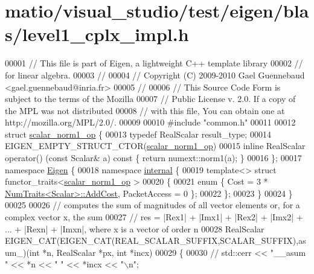 \hypertarget{matio_2visual__studio_2test_2eigen_2blas_2level1__cplx__impl_8h_source}{}\section{matio/visual\+\_\+studio/test/eigen/blas/level1\+\_\+cplx\+\_\+impl.h}
\label{matio_2visual__studio_2test_2eigen_2blas_2level1__cplx__impl_8h_source}

\begin{DoxyCode}
00001 \textcolor{comment}{// This file is part of Eigen, a lightweight C++ template library}
00002 \textcolor{comment}{// for linear algebra.}
00003 \textcolor{comment}{//}
00004 \textcolor{comment}{// Copyright (C) 2009-2010 Gael Guennebaud <gael.guennebaud@inria.fr>}
00005 \textcolor{comment}{//}
00006 \textcolor{comment}{// This Source Code Form is subject to the terms of the Mozilla}
00007 \textcolor{comment}{// Public License v. 2.0. If a copy of the MPL was not distributed}
00008 \textcolor{comment}{// with this file, You can obtain one at http://mozilla.org/MPL/2.0/.}
00009 
00010 \textcolor{preprocessor}{#include "common.h"}
00011 
00012 \textcolor{keyword}{struct }\hyperlink{structscalar__norm1__op}{scalar\_norm1\_op} \{
00013   \textcolor{keyword}{typedef} RealScalar result\_type;
00014   EIGEN\_EMPTY\_STRUCT\_CTOR(\hyperlink{structscalar__norm1__op}{scalar\_norm1\_op})
00015   \textcolor{keyword}{inline} RealScalar operator() (\textcolor{keyword}{const} Scalar& a)\textcolor{keyword}{ const }\{ \textcolor{keywordflow}{return} numext::norm1(a); \}
00016 \};
00017 \textcolor{keyword}{namespace }\hyperlink{namespace_eigen}{Eigen} \{
00018   \textcolor{keyword}{namespace }\hyperlink{namespaceinternal}{internal} \{
00019     \textcolor{keyword}{template}<> \textcolor{keyword}{struct }functor\_traits<\hyperlink{structscalar__norm1__op}{scalar\_norm1\_op} >
00020     \{
00021       \textcolor{keyword}{enum} \{ Cost = 3 * \hyperlink{group___core___module_struct_eigen_1_1_num_traits}{NumTraits<Scalar>::AddCost}, PacketAccess = 0 \};
00022     \};
00023   \}
00024 \}
00025 
00026 \textcolor{comment}{// computes the sum of magnitudes of all vector elements or, for a complex vector x, the sum}
00027 \textcolor{comment}{// res = |Rex1| + |Imx1| + |Rex2| + |Imx2| + ... + |Rexn| + |Imxn|, where x is a vector of order n}
00028 RealScalar EIGEN\_CAT(EIGEN\_CAT(REAL\_SCALAR\_SUFFIX,SCALAR\_SUFFIX),asum\_)(\textcolor{keywordtype}{int} *n, RealScalar *px, \textcolor{keywordtype}{int} *incx)
00029 \{
00030 \textcolor{comment}{//   std::cerr << "\_\_asum " << *n << " " << *incx << "\(\backslash\)n";}

\end{DoxyCode}
